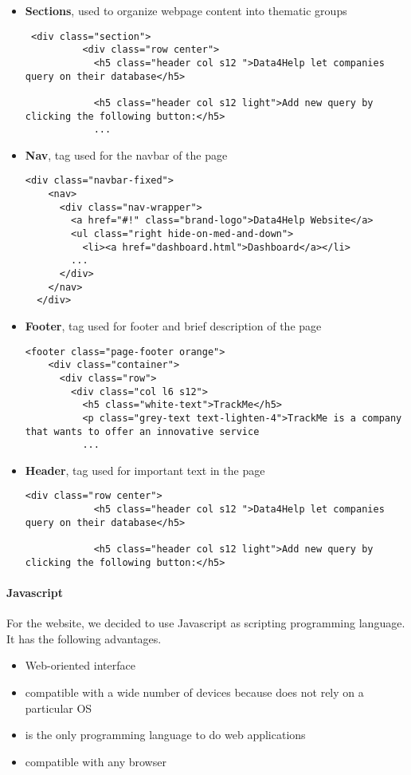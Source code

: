 \begin{itemize}
    \item \textbf{Sections}, used to organize webpage content into thematic groups
\begin{verbatim}
 <div class="section">
          <div class="row center">
            <h5 class="header col s12 ">Data4Help let companies query on their database</h5>

            <h5 class="header col s12 light">Add new query by clicking the following button:</h5>
            ...
\end{verbatim}

    \item \textbf{Nav}, tag used for the navbar of the page
\begin{verbatim}
<div class="navbar-fixed">
    <nav>
      <div class="nav-wrapper">
        <a href="#!" class="brand-logo">Data4Help Website</a>
        <ul class="right hide-on-med-and-down">
          <li><a href="dashboard.html">Dashboard</a></li>
        ...
      </div>
    </nav>
  </div>
\end{verbatim}

    \item \textbf{Footer}, tag used for footer and brief description of the page
\begin{verbatim}
<footer class="page-footer orange">
    <div class="container">
      <div class="row">
        <div class="col l6 s12">
          <h5 class="white-text">TrackMe</h5>
          <p class="grey-text text-lighten-4">TrackMe is a company that wants to offer an innovative service
          ...
\end{verbatim}

    \item \textbf{Header}, tag used for important text in the page
\begin{verbatim}
<div class="row center">
            <h5 class="header col s12 ">Data4Help let companies query on their database</h5>

            <h5 class="header col s12 light">Add new query by clicking the following button:</h5>
\end{verbatim}

\end{itemize}

\paragraph{Javascript}
For the website, we decided to use Javascript as scripting programming language.
It has the following advantages.
\begin{itemize}
    \item Web-oriented interface
    \item compatible with a wide number of devices because does not rely on a particular OS
    \item is the only programming language to do web applications 
    \item compatible with any browser
\end{itemize}

